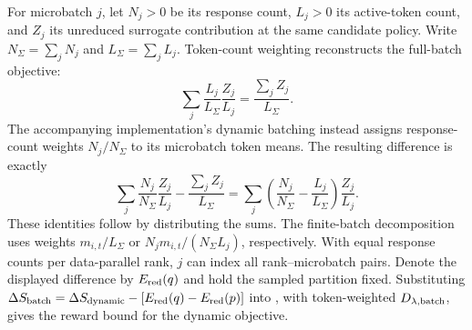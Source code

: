 For microbatch $j$, let $N_j>0$ be its response count, $L_j>0$ its
active-token count, and $Z_j$ its unreduced surrogate contribution at the same
candidate policy. Write $N_\Sigma=\sum_jN_j$ and $L_\Sigma=\sum_jL_j$.
Token-count weighting reconstructs the full-batch objective:
\[
 \sum_j\frac{L_j}{L_\Sigma}\frac{Z_j}{L_j}
 =\frac{\sum_jZ_j}{L_\Sigma}.
\]
The accompanying implementation's dynamic batching instead assigns
response-count weights $N_j/N_\Sigma$ to its microbatch token means.
The resulting difference is exactly
\[
 \sum_j\frac{N_j}{N_\Sigma}\frac{Z_j}{L_j}
 -\frac{\sum_jZ_j}{L_\Sigma}
 =\sum_j\left(\frac{N_j}{N_\Sigma}-\frac{L_j}{L_\Sigma}\right)
                  \frac{Z_j}{L_j}.
\]
These identities follow by distributing the sums. The finite-batch decomposition
uses weights $m_{i,t}/L_\Sigma$ or $N_jm_{i,t}/(N_\Sigma L_j)$, respectively.
With equal response counts per data-parallel rank, $j$ can index all
rank--microbatch pairs. Denote the displayed difference by $E_{\rm red}(q)$
and hold the sampled partition fixed. Substituting
$\Delta S_{\rm batch}=\Delta S_{\rm dynamic}-[E_{\rm red}(q)-E_{\rm red}(p)]$
into , with token-weighted $D_{\lambda,\rm batch}$,
gives the reward bound for the dynamic objective.
